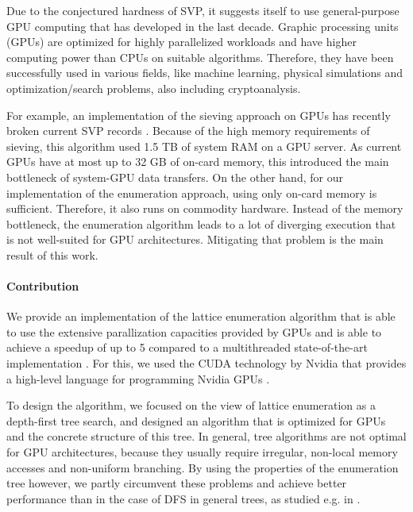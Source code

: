 \documentclass{scrartcl}
\begin{document}
    Due to the conjectured hardness of SVP, it suggests itself to use general-purpose GPU computing that has developed in the last decade.
    Graphic processing units (GPUs) are optimized for highly parallelized workloads and have higher computing power than CPUs on suitable algorithms.
    Therefore, they have been successfully used in various fields, like machine learning, physical simulations and optimization/search problems, also including cryptoanalysis.
    
    For example, an implementation of the sieving approach on GPUs has recently broken current SVP records \cite{sieving_gpu}.
    Because of the high memory requirements of sieving, this algorithm used 1.5 TB of system RAM on a GPU server. As current GPUs have at most up to 32 GB of on-card memory, this introduced the main bottleneck of system-GPU data transfers.
    On the other hand, for our implementation of the enumeration approach, using only on-card memory is sufficient. Therefore, it also runs on commodity hardware.
    Instead of the memory bottleneck, the enumeration algorithm leads to a lot of diverging execution that is not well-suited for GPU architectures.
    Mitigating that problem is the main result of this work.

    \paragraph{Contribution}
    We provide an implementation of the lattice enumeration algorithm that is able to use the extensive parallization capacities provided by GPUs and is able to achieve a speedup of up to 5 compared to a multithreaded state-of-the-art implementation \cite{fplll}.
    For this, we used the CUDA technology by Nvidia that provides a high-level language for programming Nvidia GPUs \cite{cuda}.
    
    To design the algorithm, we focused on the view of lattice enumeration as a depth-first tree search, and designed an algorithm that is optimized for GPUs and the concrete structure of this tree. 
    In general, tree algorithms are not optimal for GPU architectures, because they usually require irregular, non-local memory accesses and non-uniform branching.
    By using the properties of the enumeration tree however, we partly circumvent these problems and achieve better performance than in the case of DFS in general trees, as studied e.g. in \cite{tree_search_cuda}.
\end{document}
